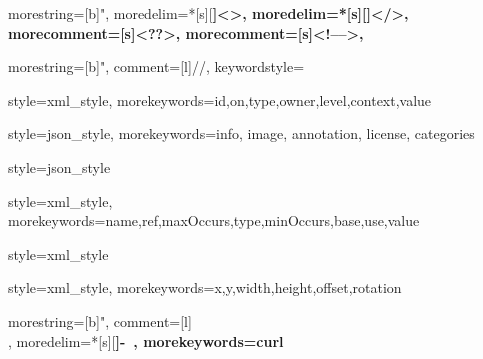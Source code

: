 \usepackage{listings}

\usepackage{color}

\renewcommand{\lstlistlistingname}{List of Listings}


\newcommand{\beginlstdelim}[3]
{%
  \def\endlstdelim{#2\egroup}%
  \ttfamily#1\bgroup\color{#3}\aftergroup\endlstdelim%
}

{
  morestring=[b]",
  moredelim=*[s][\bfseries\color{maroon}]{<}{>},
  moredelim=*[s][\bfseries\color{maroon}]{</}{>},
  morecomment=[s]{<?}{?>},
  morecomment=[s]{<!--}{-->},
}

{
  morestring=[b]",
  comment=[l]{//},
  keywordstyle=\bfseries\color{maroon}
}

{
  style=xml_style,
  morekeywords={id,on,type,owner,level,context,value}
}

{
  style=json_style,
  morekeywords={info, image, annotation, license, categories}
}

{
  style=json_style
}

{
  style=xml_style,
  morekeywords={name,ref,maxOccurs,type,minOccurs,base,use,value}
}

{
  style=xml_style
}

{
  style=xml_style,
  morekeywords={x,y,width,height,offset,rotation}
}

{
  morestring=[b]",
  comment=[l]{\\},
  moredelim=*[s][\bfseries\color{maroon}]{-}{\ },
  morekeywords={curl}
}